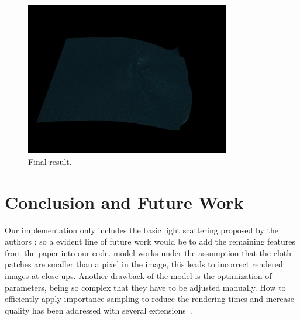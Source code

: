 \documentclass[12pt]{article}
\begin{document}
\begin{figure}[htbp!]
\centering
\includegraphics[width=0.8\textwidth]{images/full_model}
	\caption{Final result.}
	\label{fig:full_model}
\end{figure}

\FloatBarrier
\section{Conclusion and Future Work}

Our implementation only includes the basic light scattering proposed by the authors \cite{Sadeghi2013}; so a evident line of future work would be to add the remaining features from the paper into our code.
\citeauthor{Sadeghi2013} model works under the assumption that the cloth patches are smaller than a pixel in the image, this leads to incorrect rendered images at close ups.
Another drawback of the model is the optimization of parameters, being so complex that they have to be adjusted manually.
How to efficiently apply importance sampling to reduce the rendering times and increase quality has been addressed with several extensions~\cite{Wang2014, Mizutani2014}.

\newpage


\end{document}
